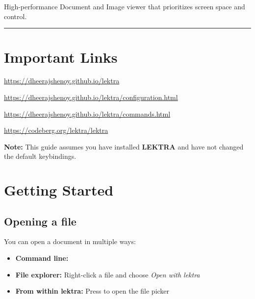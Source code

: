 \documentclass[a4paper,12pt]{article}
\begin{document}

High-performance Document and Image viewer that prioritizes screen space and control.

\vspace{1em}
\hrule
\vspace{1em}

\section*{Important Links}

\begin{description}[labelwidth=2.2cm, labelsep=0.8em, align=right, leftmargin=0pt]
    \item[\textbf{Homepage}]       \url{https://dheerajshenoy.github.io/lektra}
    \item[\textbf{Configuration}]  \url{https://dheerajshenoy.github.io/lektra/configuration.html}
    \item[\textbf{Commands}]       \url{https://dheerajshenoy.github.io/lektra/commands.html}
    \item[\textbf{Code}]           \url{https://codeberg.org/lektra/lektra}
\end{description}

\begin{ghnote}
    \textbf{Note:} This guide assumes you have installed \textbf{LEKTRA} and have not changed the default keybindings.
\end{ghnote}

\tableofcontents
\newpage

\section{Getting Started}

\subsection{Opening a file}
You can open a document in multiple ways:

\begin{itemize}[leftmargin=*]
    \item \textbf{Command line:} 
    \item \textbf{File explorer:} Right-click a file and choose \textit{Open with lektra}
    \item \textbf{From within lektra:} Press  to open the file picker
\end{itemize}
\end{document}
